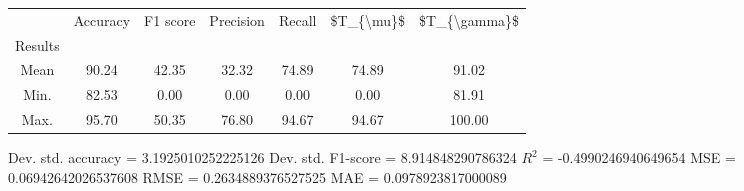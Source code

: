 \begin{tabular}{|c|c|c|c|c|c|c|}
\toprule
{} &  Accuracy &  F1 score &  Precision &  Recall &  \$T\_\{\textbackslash mu\}\$ &  \$T\_\{\textbackslash gamma\}\$ \\
Results &           &           &            &         &            &               \\
\hline
Mean    &     90.24 &     42.35 &      32.32 &   74.89 &      74.89 &         91.02 \\
Min.    &     82.53 &      0.00 &       0.00 &    0.00 &       0.00 &         81.91 \\
Max.    &     95.70 &     50.35 &      76.80 &   94.67 &      94.67 &        100.00 \\
\bottomrule
\end{tabular}

 Dev. std. accuracy = 3.1925010252225126
 Dev. std. F1-score = 8.914848290786324
 $R^2$ = -0.4990246940649654
 MSE = 0.06942642026537608
 RMSE = 0.2634889376527525
 MAE = 0.0978923817000089